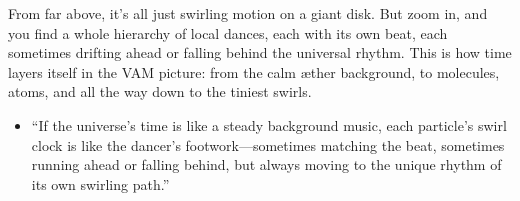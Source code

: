 From far above, it’s all just swirling motion on a giant disk. But zoom in, and you find a whole hierarchy of local dances, each with its own beat, each sometimes drifting ahead or falling behind the universal rhythm. This is how time layers itself in the VAM picture: from the calm æther background, to molecules, atoms, and all the way down to the tiniest swirls.


\begin{itemize}

\item
“If the universe’s time is like a steady background music, each particle’s swirl clock is like the dancer’s footwork—sometimes matching the beat, sometimes running ahead or falling behind, but always moving to the unique rhythm of its own swirling path.”




\end{itemize}